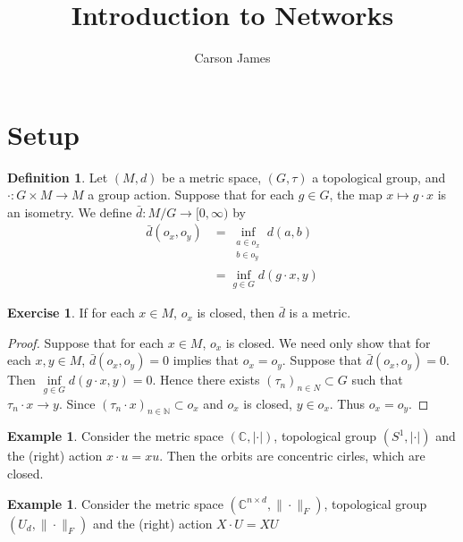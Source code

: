 \documentclass[12pt]{amsart}
\theoremstyle{definition}
\newtheorem{defn}[definition]{Definition}
\newtheorem{ex}[definition]{Exercise}
\newtheorem{exm}[definition]{Example}
\newcommand{\C}{\mathbb{C}}
\newcommand{\N}{\mathbb{N}}
\newcommand{\Rg}{[0,\infty)}
\begin{document}
	
	\title{Introduction to Networks}
	\author{Carson James}
	\maketitle
	
	\tableofcontents
	
	\section{Setup}
	\begin{defn}
	Let $(M, d)$ be a metric space, $(G, \tau)$ a topological group, and $\cdot: G \times M \rightarrow M$ a group action.  
	Suppose that for each $g \in G$, the map $x \mapsto g \cdot x$ is an isometry. We define 
	$\bar{d}: M / G \rightarrow \Rg$ by 
	\begin{align*}
	\bar{d}(o_x, o_y) 
	&= \inf_{\substack{a \in o_x \\ b \in o_y}} d(a,b) \\
	&= \inf_{g \in G} d(g \cdot x, y)
	\end{align*}
	
	\end{defn}
	
	
	
	\begin{ex}
	If for each $x \in M$, $o_x$ is closed, then $\bar{d}$ is a metric.
	\end{ex}
	
	\begin{proof}
	Suppose that for each $x \in M$, $o_x$ is closed. We need only show that for each $x,y \in M$, $\bar{d}(o_x , o_y) = 0$ implies that $o_x = o_y$. Suppose that $\bar{d}(o_x , o_y) = 0$. Then $\inf\limits_{ g \in G} d(g \cdot x, y) = 0$. Hence there exists $(\tau_n)_{n \in N} \subset G$ such that $\tau_n \cdot x \rightarrow y$. Since $(\tau_n \cdot x)_{n \in \N} \subset o_x$ and $o_x$ is closed, $y \in o_x$. Thus $o_x = o_y$. 
	\end{proof}
	
	\begin{exm}
	Consider the metric space $(\C, | \cdot |)$, topological group $(S^1, | \cdot |)$ and  the (right) action $x \cdot u = xu$. Then the orbits are concentric cirles, which are closed. 
	\end{exm}
	
	\begin{exm}
	Consider the metric space $(\C^{n \times d}, \|\cdot\|_F)$, topological group $(U_d, \|\cdot\|_F)$ and  the (right) action $X \cdot U = XU$
	\end{exm}
	
\end{document}
